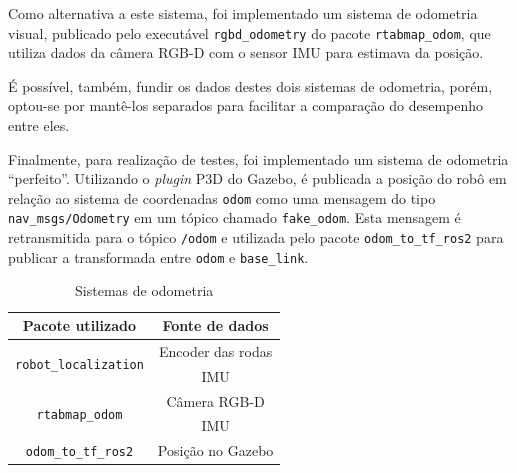 \documentclass[repeatfields,xlists,xpacks,oneside,yearsonly]{ufrgscca}
\begin{document}

Como alternativa a este sistema, foi implementado um sistema de odometria visual,
publicado pelo executável \texttt{rgbd\_odometry} do pacote 
\texttt{rtabmap\_odom}, que utiliza dados da câmera RGB-D com
o sensor IMU para estimava da posição.

É possível, também, fundir os dados destes dois sistemas de odometria, 
porém, optou-se por mantê-los separados para facilitar a comparação
do desempenho entre eles.

Finalmente, para realização de testes, foi implementado um sistema de odometria 
“perfeito”. 
Utilizando o \textit{plugin} P3D do Gazebo, é publicada a posição
do robô em relação ao sistema de coordenadas \texttt{odom} como uma mensagem
do tipo \texttt{nav\_msgs/Odometry} em um tópico chamado \texttt{fake\_odom}.
Esta mensagem é retransmitida para o tópico \texttt{/odom} e utilizada pelo
pacote \texttt{odom\_to\_tf\_ros2} para publicar a transformada entre
\texttt{odom} e \texttt{base\_link}.


\begin{table}[h]
    \begin{center}
    \caption{Sistemas de odometria}
    \label{tab:odometria}
    \begin{tabular}{c|c}
    \hline
    Pacote utilizado & Fonte de dados \\
    \hline
    \multirow{2}{*}{\texttt{robot\_localization}} & Encoder das rodas \\ \cline{2-2}
                                                  & IMU	\\
    \hline
    \multirow{2}{*}{\texttt{rtabmap\_odom}} & Câmera RGB-D \\ \cline{2-2}
                                            & IMU  	\\
    \hline
    \texttt{odom\_to\_tf\_ros2} & Posição no Gazebo	\\
    \hline
    \end{tabular}
\end{center}
{}
\end{table}
\end{document}
